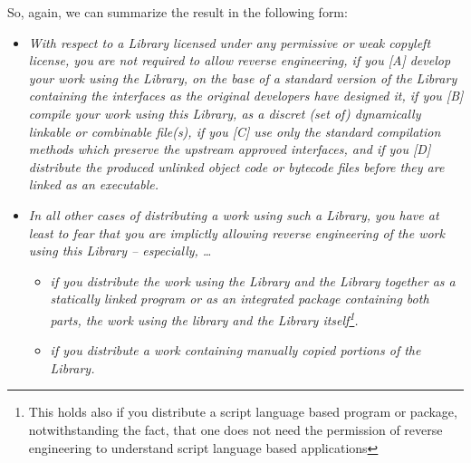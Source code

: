 So, again, we can summarize the result in the following form:

\begin{itemize}
  \item \emph{With respect to a Library licensed under any permissive or weak
  copyleft license, you are not required to allow reverse engineering, if you
  [A] develop your work using the Library, on the base of a standard version of
  the Library containing the interfaces as the original developers have designed it,
  if you [B] compile your work using this Library, as a discret (set of)
  dynamically linkable or combinable file(s), if you [C] use only the standard
  compilation methods which preserve the upstream approved interfaces, and if
  you [D] distribute the produced unlinked object code or bytecode files before
  they are linked as an executable.}
  \item \emph{In all other cases of distributing a work using such a Library,
  you have at least to fear that you are implictly allowing reverse engineering
  of the work using this Library -- especially, \ldots}
  \begin{itemize}
    \item \emph{if you distribute the work using the Library and the Library
    together as a statically linked program or as an integrated package
    containing both parts, the work using the library and the Library
    itself\footnote{This holds also if you distribute a script language based
    program or package, notwithstanding the fact, that one does not need the
    permission of reverse engineering to understand script language based
    applications}.}
    \item \emph{if you distribute a work containing manually copied portions of
    the Library.}
  \end{itemize}
\end{itemize}



